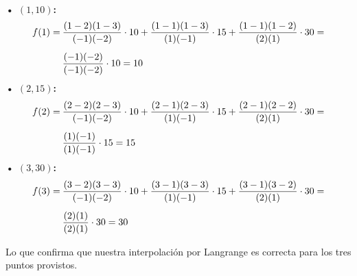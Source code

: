 \documentclass[letterpaper, 12pt]{article}
\begin{document}
\\\newline
\textbf{• \(\left(1,10\right)\):}
{\large\begin{equation*}
    \begin{aligned}
        f(1)=\:&{(1-2)(1-3)\over(-1)(-2)}\cdot 10+
{(1-1)(1-3)\over(1)(-1)}\cdot 15+
{(1-1)(1-2)\over(2)(1)}\cdot 30=\\[5pt]
&{(-1)(-2)\over(-1)(-2)}\cdot 10=10
    \end{aligned}
\end{equation*}}
\textbf{• \(\left(2,15\right)\):}
{\large\begin{equation*}
    \begin{aligned}
        f(2)=\:&{(2-2)(2-3)\over(-1)(-2)}\cdot 10+
{(2-1)(2-3)\over(1)(-1)}\cdot 15+
{(2-1)(2-2)\over(2)(1)}\cdot 30=\\[5pt]
&{(1)(-1)\over(1)(-1)}\cdot 15=15
    \end{aligned}
\end{equation*}}
\textbf{• \(\left(3,30\right)\):}
{\large\begin{equation*}
    \begin{aligned}
        f(3)=\:&{(3-2)(3-3)\over(-1)(-2)}\cdot 10+
{(3-1)(3-3)\over(1)(-1)}\cdot 15+
{(3-1)(3-2)\over(2)(1)}\cdot 30=\\[5pt]
&{(2)(1)\over(2)(1)}\cdot 30=30\\[5pt]
    \end{aligned}
\end{equation*}}
\justify
Lo que confirma que nuestra interpolación por Langrange es correcta para los tres puntos provistos.
\end{document}
